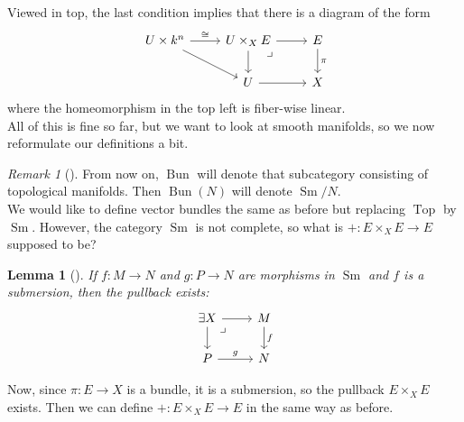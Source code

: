 \documentclass[reqno]{amsart}
\newtheorem{lemma}[theorem]{Lemma}
\theoremstyle{definition}
\theoremstyle{remark}
\newtheorem*{remark}{Remark}
\DeclareMathOperator{\Top}{Top}
\DeclareMathOperator{\Bun}{Bun}
\DeclareMathOperator{\Sm}{Sm}
\begin{document}
    Viewed in top, the last condition implies that there
    is a diagram of the form
    \begin{equation*}
    \begin{tikzcd}
        U \times k^{n} \ar[r, "\cong"] \ar[dr] & U \times_X E \ar[r]
        \ar[d] \ar[dr, phantom, "\lrcorner", very near start] & E
        \ar[d, "\pi"] \\
                                       & U \ar[r] & X
    \end{tikzcd}
    \end{equation*}
    where the homeomorphism in the top left
    is fiber-wise linear.\\
    \linebreak
    All of this is fine so far, but we want to look at
    smooth manifolds, so we now
    reformulate our definitions a bit. 
    \begin{remark}[]
        From now on, $\Bun$ will denote that
        subcategory consisting of
        topological manifolds.
        Then
        $\Bun (N)$ will denote
        $\Sm / N$.\\
        \linebreak
        We would like to define vector bundles
        the same as before but replacing
        $\Top$ by $\Sm$. However, the category
        $\Sm$ is not complete, so
        what is $+ \colon E \times_X E \to E$ supposed to be?
    \end{remark}

    \begin{lemma}[]
        If $f \colon M \to N$ and $g \colon P \to N$ are
        morphisms in $\Sm$ and $f$ is a submersion, then
        the pullback exists:
        \begin{equation*}
        \begin{tikzcd}
            \exists X \ar[r] \ar[d] 
            \ar[dr, phantom, "\lrcorner", very near start]
            & M \ar[d, "f"] \\
            P \ar[r, "g"] & N
        \end{tikzcd}
        \end{equation*}
    \end{lemma}

    Now, since $\pi \colon E \to X$ is a bundle, it is
    a submersion, so
    the pullback
    $E \times_X E$ exists. Then we can define
    $+ \colon E \times_X E \to E$ in the same way as
    before.
\end{document}
